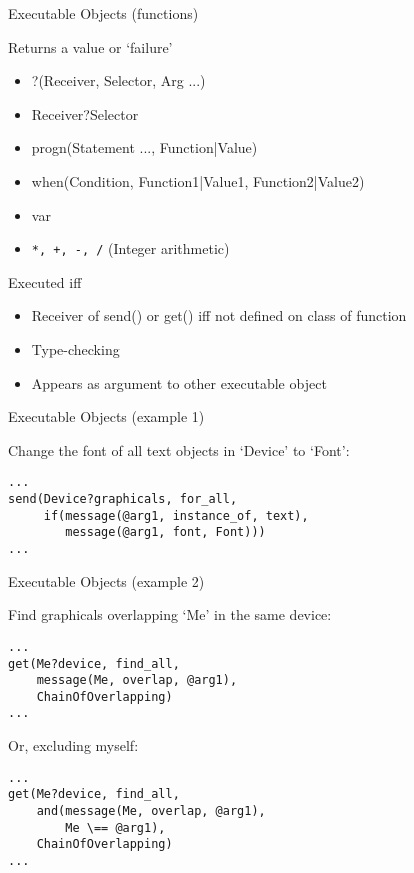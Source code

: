 \begin{sli}{Executable Objects (functions)}

Returns  a value or `failure'

\begin{itemize}
    \item ?(Receiver, Selector, Arg ...)
    \item Receiver?Selector
    \item progn(Statement ..., Function|Value)
    \item when(Condition, Function1|Value1, Function2|Value2)
    \item var
    \item \verb$*, +, -, /$ (Integer arithmetic)
\end{itemize}

Executed iff

\begin{itemize}
    \item Receiver of send() or get() iff not defined on class of
          function
    \item Type-checking
    \item Appears as argument to other executable object
\end{itemize}

\end{sli}


\begin{sli}{Executable Objects (example 1)}

Change the font of all text objects in `Device' to `Font':

\begin{verbatim}
...
send(Device?graphicals, for_all,
     if(message(@arg1, instance_of, text),
        message(@arg1, font, Font)))
...
\end{verbatim}

\noindent
\end{sli}

\begin{sli}{Executable Objects (example 2)}

Find graphicals overlapping `Me' in the same device:

\begin{verbatim}
...
get(Me?device, find_all,
    message(Me, overlap, @arg1),
    ChainOfOverlapping)
...
\end{verbatim}

\noindent
Or, excluding myself:

\begin{verbatim}
...
get(Me?device, find_all,
    and(message(Me, overlap, @arg1),
        Me \== @arg1),
    ChainOfOverlapping)
...
\end{verbatim}

\noindent
\end{sli}


